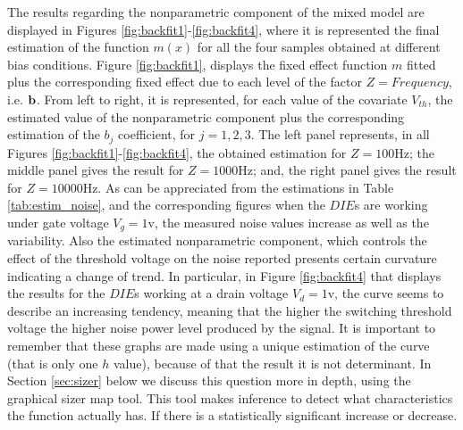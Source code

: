 \documentclass[sn-mathphys]{sn-jnl}%
\theoremstyle{thmstyleone}%
\theoremstyle{thmstyletwo}%
\theoremstyle{thmstylethree}%
\begin{document}
The results regarding the nonparametric component of the mixed model are displayed in Figures \ref{fig:backfit1}-\ref{fig:backfit4}, where it is represented the final estimation of the function $m(x)$ for all the four samples obtained at different bias conditions. Figure \ref{fig:backfit1}, displays the fixed effect function $m$  fitted plus the corresponding fixed effect due to each level of the factor $Z=Frequency$, i.e. ${\bf b}$. From left to right, it is represented, for each value of the covariate $V_{th}$, the estimated value of the nonparametric component plus the corresponding estimation of the $b_j$ coefficient, for $j=1,2, 3$. The left panel represents, in all Figures \ref{fig:backfit1}-\ref{fig:backfit4}, the obtained estimation for $Z=100$Hz; the middle panel gives the result for $Z=1000$Hz; and, the right panel gives the result for $Z=10000$Hz.  As can be appreciated from the estimations in Table \ref{tab:estim_noise}, and the corresponding figures when the $DIE$s are working under gate voltage $V_g=1$v, the measured noise values increase as well as the variability. Also the estimated nonparametric component, which controls the effect of the threshold voltage on the noise reported presents certain curvature indicating a change of trend. In particular, in Figure \ref{fig:backfit4} that displays the results for the $DIE$s working at a drain voltage $V_d=1$v, the curve seems to describe an increasing tendency, meaning that the higher the switching threshold voltage  the higher noise power level produced by the signal.  It is important to remember that these graphs are made using a unique estimation of the curve (that is only one $h$ value), because of that the result it is not determinant. In Section \ref{sec:sizer} below we discuss this question more in depth, using the graphical sizer map tool. This tool makes inference to detect what characteristics the function actually has. If there is a statistically significant increase or decrease. 
\end{document}
